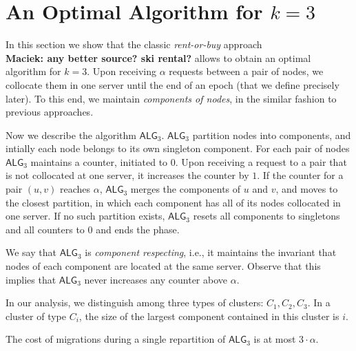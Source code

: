 \documentclass[manuscript,screen=true]{acmart}
\newcommand{\TAlg}{{\ensuremath{\textsf{ALG}_{3}}}\xspace} %
\newcommand\maciek[1]{\color{brown}\textbf{\\ Maciek: #1}\color{black}}
\begin{document}
\section{An Optimal Algorithm for $k=3$}

In this section we show that the classic \emph{rent-or-buy} approach\cite{borodin-book}\maciek{any better source? ski rental?} allows to obtain an optimal algorithm for $k=3$.
Upon receiving $\alpha$ requests between a pair of nodes, we collocate them in one server until the end of an epoch (that we define precisely later).
To this end, we maintain \emph{components of nodes}, in the similar fashion to previous approaches\cite{repartition-disc}.


Now we describe the algorithm \TAlg.
\TAlg partition nodes into components, and
intially each node belongs to its own singleton component.
For each pair of nodes \TAlg maintains a counter, initiated to $0$. 
Upon receiving a request to a pair that is not collocated at one server, it increases the counter by $1$.
If the counter for a pair $(u,v)$ reaches $\alpha$, \TAlg merges the components of $u$ and $v$, and moves to the closest partition, in which each component has all of its nodes collocated in one server.
If no such partition exists, \TAlg resets all components to singletons and all counters to $0$ and ends the phase.


We say that \TAlg is \emph{component respecting}, i.e., it maintains the invariant that nodes of each component are located at the same server.
Observe that this implies that \TAlg never increases any counter above $\alpha$.

In our analysis, we distinguish among three types of clusters: $C_1, C_2, C_3$. In a cluster of type $C_i$, the size of the largest component contained in this cluster is $i$.

\begin{lemma}
  \label{lem:1req}
  The cost of migrations during a single repartition of \TAlg is at most $3\cdot\alpha$.
\end{lemma}
\end{document}
